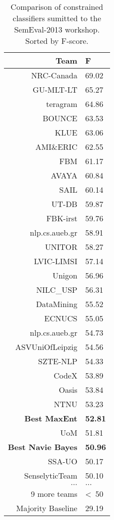 \documentclass[final,3p,12pt]{elsarticle}
\begin{document}
\begin{table}[H]
    \begin{center}
    \begin{tabular}{|r|l|}
        \hline
        Team       & F \\
        \hline
        NRC-Canada & 69.02 \\
        GU-MLT-LT  & 65.27 \\
        teragram   & 64.86 \\
        BOUNCE     & 63.53 \\
        KLUE       & 63.06 \\
        AMI\&ERIC  & 62.55 \\
        FBM        & 61.17 \\
        AVAYA      & 60.84 \\
        SAIL       & 60.14 \\
        UT-DB      & 59.87 \\
        FBK-irst   & 59.76 \\
        nlp.cs.aueb.gr & 58.91 \\
        UNITOR     & 58.27 \\
        LVIC-LIMSI & 57.14 \\
        Unigon     & 56.96 \\
        NILC\_USP  & 56.31 \\
        DataMining & 55.52 \\
        ECNUCS     & 55.05 \\
        nlp.cs.aueb.gr & 54.73 \\
        ASVUniOfLeipzig & 54.56 \\
        SZTE-NLP   & 54.33 \\
        CodeX      & 53.89 \\
        Oasis      & 53.84 \\
        NTNU       & 53.23 \\
        \textbf{Best MaxEnt}& \textbf{52.81} \\
        UoM        & 51.81 \\
        \textbf{Best Navie Bayes}& \textbf{50.96} \\
        SSA-UO     & 50.17 \\
        SenselyticTeam & 50.10 \\
        $\ldots$   & $\ldots$ \\
        9 more teams &  \textless\ 50 \\
        \hline
        Majority Baseline & 29.19 \\
        \hline
    \end{tabular}
    \end{center}
    \caption{Comparison of constrained classifiers sumitted to the SemEval-2013
        workshop. Sorted by F-score.}
    \label{table:comparison}
\end{table}
\end{document}
